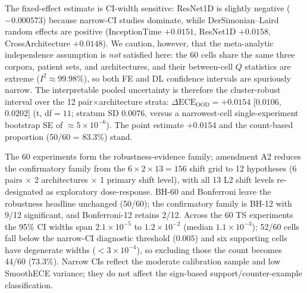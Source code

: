 \documentclass[review,12pt,nonatbib]{elsarticle}
\begin{document}
The
fixed-effect estimate is CI-width sensitive: ResNet1D is slightly
negative ($-0.000573$) because narrow-CI studies dominate, while
DerSimonian--Laird random effects are positive (InceptionTime
$+0.0151$, ResNet1D $+0.0158$, CrossArchitecture $+0.0148$). We caution, however, that the
meta-analytic independence assumption is \emph{not} satisfied here: the
60 cells share the same three corpora, patient sets, and architectures,
and their between-cell $Q$ statistics are extreme
($I^2 \approx 99.98\%$), so both FE and DL confidence intervals are
spuriously narrow. The interpretable pooled uncertainty is therefore the
cluster-robust interval over the 12 pair$\times$architecture strata:
$\Delta\text{ECE}_{\text{OOD}} = +0.0154$ [$0.0106$, $0.0202$] (t,
df$=11$; stratum SD $0.0076$, versus a narrowest-cell single-experiment
bootstrap SE of $\approx 5\times10^{-6}$). The point estimate $+0.0154$
and the count-based proportion (50/60 = 83.3\%) stand.

The 60 experiments form the robustness-evidence family; amendment A2
reduces the confirmatory family from the $6 \times 2 \times 13 = 156$
shift grid to 12 hypotheses (6 pairs $\times$ 2 architectures $\times$ 1
primary shift level), with all 13 L2 shift levels re-designated as
exploratory dose-response. BH-60 and Bonferroni
leave the robustness headline unchanged (50/60); the confirmatory family
is BH-12 with 9/12 significant, and Bonferroni-12
retains 2/12. Across the 60 TS experiments the 95\% CI widths span
$2.1\times10^{-5}$ to $1.2\times10^{-2}$ (median $1.1\times10^{-3}$);
52/60 cells fall below the narrow-CI diagnostic threshold ($0.005$) and
six supporting cells have degenerate widths ($<3\times10^{-4}$), so
excluding those the count becomes 44/60 (73.3\%). Narrow CIs reflect
the moderate calibration sample and low SmoothECE variance; they do not
affect the sign-based support/counter-example classification.

\end{document}

